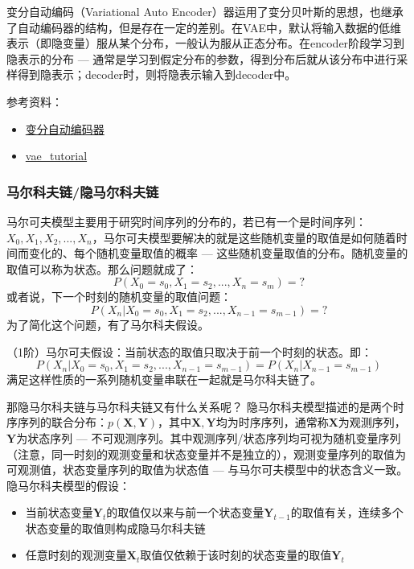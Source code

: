 变分自动编码（Variational Auto Encoder）器运用了变分贝叶斯的思想，也继承了自动编码器的结构，但是存在一定的差别。在VAE中，默认将输入数据的低维表示（即隐变量）服从某个分布，一般认为服从正态分布。在encoder阶段学习到隐表示的分布 --- 通常是学习到假定分布的参数，得到分布后就从该分布中进行采样得到隐表示；decoder时，则将隐表示输入到decoder中。

参考资料：
\begin{itemize}
	\item \href{https://www.cnblogs.com/kexinxin/p/9858525.html}{变分自动编码器}
	\item \href{https://github.com/cdoersch/vae_tutorial}{vae\_tutorial}
\end{itemize}

\subsubsection{马尔科夫链/隐马尔科夫链}
马尔可夫模型主要用于研究时间序列的分布的，若已有一个是时间序列：$X_0, X_1, X_2, ..., X_n$，马尔可夫模型要解决的就是这些随机变量的取值是如何随着时间而变化的、每个随机变量取值的概率 --- 这些随机变量取值的分布。随机变量的取值可以称为状态。那么问题就成了：
$$
P(X_0=s_0, X_1=s_2, ..., X_n=s_m) = ?
$$
或者说，下一个时刻的随机变量的取值问题：
$$
P(X_n | X_0=s_0, X_1=s_2, ..., X_{n-1}=s_{m-1}) = ?
$$
为了简化这个问题，有了马尔科夫假设。

（1阶）马尔可夫假设：当前状态的取值只取决于前一个时刻的状态。即：
$$
P(X_n | X_0=s_0, X_1=s_2, ..., X_{n-1}=s_{m-1}) = P(X_n | X_{n-1}=s_{m-1})
$$
满足这样性质的一系列随机变量串联在一起就是马尔科夫链了。

那隐马尔科夫链与马尔科夫链又有什么关系呢？
隐马尔科夫模型描述的是两个时序序列的联合分布：$p( \boldsymbol{X}, \boldsymbol{Y} )$，其中$\boldsymbol{X}, \boldsymbol{Y}$均为时序序列，通常称$\boldsymbol{X}$为观测序列，$\boldsymbol{Y}$为状态序列 --- 不可观测序列。其中观测序列/状态序列均可视为随机变量序列（注意，同一时刻的观测变量和状态变量并不是独立的），观测变量序列的取值为可观测值，状态变量序列的取值为状态值 --- 与马尔可夫模型中的状态含义一致。隐马尔科夫模型的假设：
\begin{itemize}
	\item 当前状态变量$\boldsymbol{Y}_t$的取值仅以来与前一个状态变量$\boldsymbol{Y}_{t-1}$的取值有关，连续多个状态变量的取值则构成隐马尔科夫链
	\item 任意时刻的观测变量$\boldsymbol{X}_t$取值仅依赖于该时刻的状态变量的取值$\boldsymbol{Y}_t$
\end{itemize}

